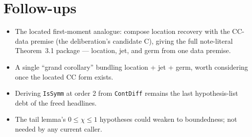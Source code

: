 \documentclass[11pt]{article}
\begin{document}
\section{Follow-ups}

\begin{itemize}[nosep]
\item The located first-moment analogue: compose location recovery with the
CC-data premise (the deliberation's candidate C), giving the full
note-literal Theorem~3.1 package --- location, jet, and germ from one data
premise.
\item A single ``grand corollary'' bundling location + jet + germ, worth
considering once the located CC form exists.
\item Deriving \texttt{IsSymm} at order 2 from \texttt{ContDiff} remains the
last hypothesis-list debt of the freed headlines.
\item The tail lemma's $0 \leq \chi \leq 1$ hypotheses could weaken to
boundedness; not needed by any current caller.
\end{itemize}
\end{document}
